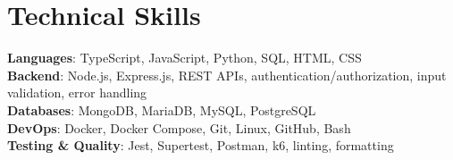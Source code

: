 \section{Technical Skills}
    \begin{itemize}[leftmargin=0.15in, label={}]
	\small{\item{
		\textbf{Languages}{: TypeScript, JavaScript, Python, SQL, HTML, CSS} \\
		\textbf{Backend}{: Node.js, Express.js, REST APIs, authentication/authorization, input validation, error handling} \\
		\textbf{Databases}{: MongoDB, MariaDB, MySQL, PostgreSQL} \\
		\textbf{DevOps}{: Docker, Docker Compose, Git, Linux, GitHub, Bash} \\
		\textbf{Testing \& Quality}{: Jest, Supertest, Postman, k6, linting, formatting}
	}}
    \end{itemize}
